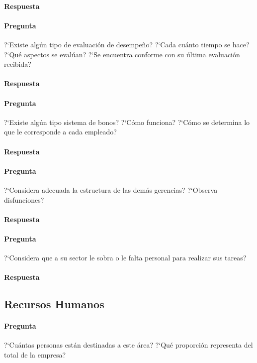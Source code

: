 \documentclass[12pt,a4paper,spanish]{article}
\begin{document}
	\paragraph{Respuesta}

	\paragraph{Pregunta}
	 ?`Existe alg\'un tipo de evaluaci\'on de desempe\~{n}o?  ?`Cada cu\'anto tiempo se hace?  ?`Qu\'e aspectos se eval\'uan?  ?`Se encuentra conforme con su \'ultima evaluaci\'on recibida?
	\paragraph{Respuesta}

	\paragraph{Pregunta}
	 ?`Existe alg\'un tipo sistema de bonos?  ?`C\'omo funciona?  ?`C\'omo se determina lo que le corresponde a cada empleado?
	\paragraph{Respuesta}

	\paragraph{Pregunta}
	 ?`Considera adecuada la estructura de las dem\'as gerencias?  ?`Observa disfunciones?
	\paragraph{Respuesta}

	\paragraph{Pregunta}
	 ?`Considera que a su sector le sobra o le falta personal para realizar sus tareas?
	\paragraph{Respuesta}

\subsection{Recursos Humanos}
	\paragraph{Pregunta}
	 ?`Cu\'antas personas est\'an destinadas a este \'area?  ?`Qu\'e proporci\'on representa del total de la empresa?
\end{document}
